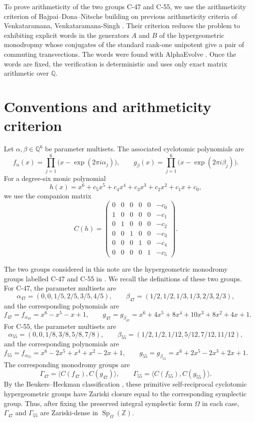 \documentclass[11pt]{article}
\DeclareMathOperator{\Sp}{Sp}
\newcommand{\QQ}{\mathbb{Q}}
\begin{document}
To prove arithmeticity of the two groups 
C-47 and C-55, we use the arithmeticity criterion of Bajpai--Dona--Nitsche
\cite{BajpaiDonaNitsche2026Arithmetic} building on previous arithmeticity criteria of Venkataramana, Venkataramana-Singh
\cite{Venkataramana1987Zariskidensesubgroups, SinghVenkataramana2014Arithmeticity,Singh2015Four}. 
Their criterion reduces the problem to 
exhibiting explicit words in the  generators $A$ and $B$ of the hypergeometric monodropmy whose
conjugates of the standard rank-one unipotent give a  pair of commuting transvections.  The words
were found with AlphaEvolve \cite{NovikovEtAl2025AlphaEvolve,georgiev2025mathematical}.  Once the
words are fixed, the verification is deterministic and uses only exact matrix arithmetic over $\QQ$.

\section{Conventions and arithmeticity criterion}

Let $\alpha,\beta\in\QQ^6$ be parameter multisets.  The associated
cyclotomic polynomials are
\[
  f_\alpha(x)=\prod_{j=1}^6\bigl(x-\exp(2\pi i\alpha_j)\bigr),\qquad
  g_\beta(x)=\prod_{j=1}^6\bigl(x-\exp(2\pi i\beta_j)\bigr).
\]
For a degree-six monic polynomial
\[
  h(x)=x^{6}+c_5x^5+c_4x^4+c_3x^3+c_2x^2+c_1x+c_0,
\]
we use the companion matrix
\[
C(h)=
\begin{pmatrix}
0&0&0&0&0&-c_0\\
1&0&0&0&0&-c_1\\
0&1&0&0&0&-c_2\\
0&0&1&0&0&-c_3\\
0&0&0&1&0&-c_4\\
0&0&0&0&1&-c_5
\end{pmatrix}.
\]

The two groups considered in this note are the hypergeometric monodromy groups
labelled C-47 and C-55 in \cite[Table 3]{BajpaiDonaNitsche2025Thin}. We recall the definitions of these two groups. For
C-47, the parameter multisets are
\[
  \alpha_{47}=(0,0,1/5,2/5,3/5,4/5),\qquad
  \beta_{47}=(1/2,1/2,1/3,1/3,2/3,2/3),
\]
and the corresponding polynomials are
\[
  f_{47}=f_{\alpha_{47}}=x^6-x^5-x+1,\qquad
  g_{47}=g_{\beta_{47}}=x^6+4x^5+8x^4+10x^3+8x^2+4x+1.
\]
For C-55, the parameter multisets are
\[
  \alpha_{55}=(0,0,1/8,3/8,5/8,7/8),\qquad
  \beta_{55}=(1/2,1/2,1/12,5/12,7/12,11/12),
\]
and the corresponding polynomials are
\[
  f_{55}=f_{\alpha_{55}}=x^6-2x^5+x^4+x^2-2x+1,\qquad
  g_{55}=g_{\beta_{55}}=x^6+2x^5-2x^3+2x+1.
\]
The corresponding monodromy groups are
\[
  \Gamma_{47}=\langle C(f_{47}),C(g_{47})\rangle,\qquad
  \Gamma_{55}=\langle C(f_{55}),C(g_{55})\rangle.
\]
By the Beukers--Heckman classification
\cite{BeukersHeckman1989hypergeometric}, these primitive self-reciprocal
cyclotomic hypergeometric groups have Zariski closure equal to the
corresponding symplectic group.  Thus, after fixing the preserved integral
symplectic form $\Omega$ in each case, $\Gamma_{47}$ and $\Gamma_{55}$ are
Zariski-dense in $\Sp_\Omega(\mathbb{Z})$.
\end{document}
